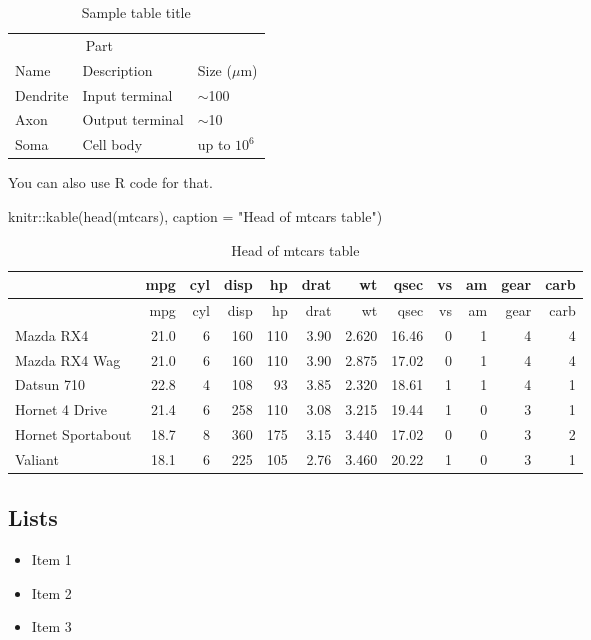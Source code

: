 \documentclass{article}
\newenvironment{Shaded}{\begin{snugshade}}{\end{snugshade}}
\newcommand{\AttributeTok}[1]{\textcolor[rgb]{0.77,0.63,0.00}{#1}}
\newcommand{\FunctionTok}[1]{\textcolor[rgb]{0.00,0.00,0.00}{#1}}
\newcommand{\NormalTok}[1]{#1}
\newcommand{\SpecialCharTok}[1]{\textcolor[rgb]{0.00,0.00,0.00}{#1}}
\newcommand{\StringTok}[1]{\textcolor[rgb]{0.31,0.60,0.02}{#1}}
\providecommand{\tightlist}{%
  \setlength{\itemsep}{0pt}\setlength{\parskip}{0pt}}
\begin{document}
\begin{table}
 \caption{Sample table title}
  \centering
  \begin{tabular}{lll}
    \toprule
    \multicolumn{2}{c}{Part}                   \\
    \cmidrule(r){1-2}
    Name     & Description     & Size ($\mu$m) \\
    \midrule
    Dendrite & Input terminal  & $\sim$100     \\
    Axon     & Output terminal & $\sim$10      \\
    Soma     & Cell body       & up to $10^6$  \\
    \bottomrule
  \end{tabular}
  \label{tab:table}
\end{table}

You can also use R code for that.

\begin{Shaded}
\begin{Highlighting}[]
\NormalTok{knitr}\SpecialCharTok{::}\FunctionTok{kable}\NormalTok{(}\FunctionTok{head}\NormalTok{(mtcars), }\AttributeTok{caption =} \StringTok{"Head of mtcars table"}\NormalTok{)}
\end{Highlighting}
\end{Shaded}

\begin{longtable}[]{@{}lrrrrrrrrrrr@{}}
\caption{Head of mtcars table}\tabularnewline
\toprule
& mpg & cyl & disp & hp & drat & wt & qsec & vs & am & gear & carb \\
\midrule
\endfirsthead
\toprule
& mpg & cyl & disp & hp & drat & wt & qsec & vs & am & gear & carb \\
\midrule
\endhead
Mazda RX4 & 21.0 & 6 & 160 & 110 & 3.90 & 2.620 & 16.46 & 0 & 1 & 4 &
4 \\
Mazda RX4 Wag & 21.0 & 6 & 160 & 110 & 3.90 & 2.875 & 17.02 & 0 & 1 & 4
& 4 \\
Datsun 710 & 22.8 & 4 & 108 & 93 & 3.85 & 2.320 & 18.61 & 1 & 1 & 4 &
1 \\
Hornet 4 Drive & 21.4 & 6 & 258 & 110 & 3.08 & 3.215 & 19.44 & 1 & 0 & 3
& 1 \\
Hornet Sportabout & 18.7 & 8 & 360 & 175 & 3.15 & 3.440 & 17.02 & 0 & 0
& 3 & 2 \\
Valiant & 18.1 & 6 & 225 & 105 & 2.76 & 3.460 & 20.22 & 1 & 0 & 3 & 1 \\
\bottomrule
\end{longtable}

\hypertarget{lists}{%
\subsection{Lists}\label{lists}}

\begin{itemize}
\tightlist
\item
  Item 1
\item
  Item 2
\item
  Item 3
\end{itemize}



\end{document}
